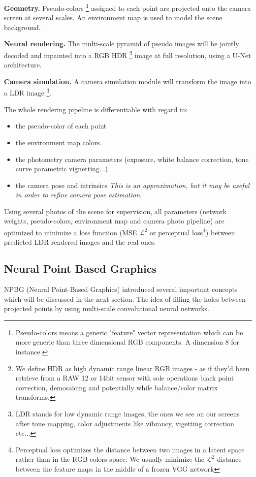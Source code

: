 \noindent\textbf{Geometry.} Pseudo-colors  \footnote{Pseudo-colors means a generic "feature" vector representation which can be more generic than three dimensional RGB components. A dimension 8 for instance.} assigned to each point are projected onto the camera screen at several scales. An environment map is used to model the scene background.

\noindent\textbf{Neural rendering.} The multi-scale pyramid of pseudo images will be jointly decoded and inpainted into a RGB HDR \footnote{We define HDR as high dynamic range linear RGB images - as if they'd been retrieve from a RAW 12 or 14bit sensor with sole operations black point correction, demosaicing and potentially while balance/color matrix transforms.} image at full resolution, using a U-Net architecture.

\noindent\textbf{Camera simulation.} A camera simulation module will transform the image into a LDR image \footnote{LDR stands for low dynamic range images, the ones we see on our screens after tone mapping, color adjustments like vibrancy, vigetting correction etc...}. 

\noindent The whole rendering pipeline is differentiable with regard to:
\begin{itemize}
    \item the pseudo-color of each point
    \item the environment map colors.
    \item the photometry camera parameters (exposure, white balance correction, tone curve parametric vignetting...)
    \item the camera pose and intrinsics \textit{This is an approximation, but it may be useful in order to refine camera pose estimation}. 
\end{itemize}

Using several photos of the scene for supervision, all parameters (network weights, pseudo-colors, environment map and camera photo pipeline) are optimized to minimize a loss function (MSE $\mathcal{L}^{2}$ or perceptual loss\footnote{Perceptual loss \cite{johnson2016perceptual} optimizes the distance between two images in a latent space rather than in the RGB colors space. We usually minimize the $\mathcal{L}^{2}$ distance between the feature maps in the middle of a frozen VGG network}) between predicted LDR rendered images and the real ones. 



\subsection{Neural Point Based Graphics}
\label{subsec:npbg}
NPBG \cite{Aliev2020} (Neural Point-Based Graphics) introduced several important concepts which will be discussed in the next section.
The idea of filling the holes between projected points by using multi-scale convolutional neural networks.  

